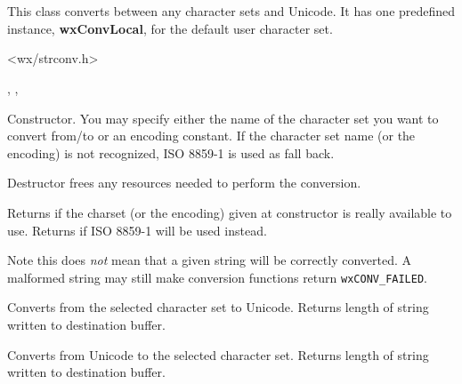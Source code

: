 %
%

\section{}\label{wxcsconv}

This class converts between any character sets and Unicode.
It has one predefined instance, {\bf wxConvLocal}, for the
default user character set.




<wx/strconv.h>


, 
, 


\label{wxcsconvwxcsconv}



Constructor. You may specify either the name of the character set you want to
convert from/to or an encoding constant. If the character set name (or the
encoding) is not recognized, ISO 8859-1 is used as fall back.


\label{wxcsconvdtor}


Destructor frees any resources needed to perform the conversion.


\label{wxcsconvisok}


Returns \true if the charset (or the encoding) given at constructor is really
available to use. Returns \false if ISO 8859-1 will be used instead.

Note this does \emph{not} mean that a given string will be correctly converted.
A malformed string may still make conversion functions return \texttt{wxCONV\_FAILED}.



\label{wxcsconvmb2wc}


Converts from the selected character set to Unicode. Returns length of string written to destination buffer.


\label{wxcsconvwc2mb}


Converts from Unicode to the selected character set. Returns length of string written to destination buffer.

